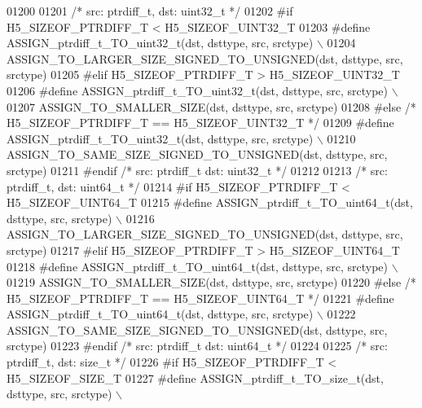 \begin{DoxyCode}
01200 
01201 \textcolor{comment}{/* src: ptrdiff\_t, dst: uint32\_t */}
01202 \textcolor{preprocessor}{#if H5\_SIZEOF\_PTRDIFF\_T < H5\_SIZEOF\_UINT32\_T}
01203 \textcolor{preprocessor}{    #define ASSIGN\_ptrdiff\_t\_TO\_uint32\_t(dst, dsttype, src, srctype) \(\backslash\)}
01204 \textcolor{preprocessor}{        ASSIGN\_TO\_LARGER\_SIZE\_SIGNED\_TO\_UNSIGNED(dst, dsttype, src, srctype)}
01205 \textcolor{preprocessor}{#elif H5\_SIZEOF\_PTRDIFF\_T > H5\_SIZEOF\_UINT32\_T}
01206 \textcolor{preprocessor}{    #define ASSIGN\_ptrdiff\_t\_TO\_uint32\_t(dst, dsttype, src, srctype) \(\backslash\)}
01207 \textcolor{preprocessor}{        ASSIGN\_TO\_SMALLER\_SIZE(dst, dsttype, src, srctype)}
01208 \textcolor{preprocessor}{#else }\textcolor{comment}{/* H5\_SIZEOF\_PTRDIFF\_T == H5\_SIZEOF\_UINT32\_T */}\textcolor{preprocessor}{}
01209 \textcolor{preprocessor}{    #define ASSIGN\_ptrdiff\_t\_TO\_uint32\_t(dst, dsttype, src, srctype) \(\backslash\)}
01210 \textcolor{preprocessor}{        ASSIGN\_TO\_SAME\_SIZE\_SIGNED\_TO\_UNSIGNED(dst, dsttype, src, srctype)}
01211 \textcolor{preprocessor}{#endif }\textcolor{comment}{/* src: ptrdiff\_t dst: uint32\_t */}\textcolor{preprocessor}{}
01212 
01213 \textcolor{comment}{/* src: ptrdiff\_t, dst: uint64\_t */}
01214 \textcolor{preprocessor}{#if H5\_SIZEOF\_PTRDIFF\_T < H5\_SIZEOF\_UINT64\_T}
01215 \textcolor{preprocessor}{    #define ASSIGN\_ptrdiff\_t\_TO\_uint64\_t(dst, dsttype, src, srctype) \(\backslash\)}
01216 \textcolor{preprocessor}{        ASSIGN\_TO\_LARGER\_SIZE\_SIGNED\_TO\_UNSIGNED(dst, dsttype, src, srctype)}
01217 \textcolor{preprocessor}{#elif H5\_SIZEOF\_PTRDIFF\_T > H5\_SIZEOF\_UINT64\_T}
01218 \textcolor{preprocessor}{    #define ASSIGN\_ptrdiff\_t\_TO\_uint64\_t(dst, dsttype, src, srctype) \(\backslash\)}
01219 \textcolor{preprocessor}{        ASSIGN\_TO\_SMALLER\_SIZE(dst, dsttype, src, srctype)}
01220 \textcolor{preprocessor}{#else }\textcolor{comment}{/* H5\_SIZEOF\_PTRDIFF\_T == H5\_SIZEOF\_UINT64\_T */}\textcolor{preprocessor}{}
01221 \textcolor{preprocessor}{    #define ASSIGN\_ptrdiff\_t\_TO\_uint64\_t(dst, dsttype, src, srctype) \(\backslash\)}
01222 \textcolor{preprocessor}{        ASSIGN\_TO\_SAME\_SIZE\_SIGNED\_TO\_UNSIGNED(dst, dsttype, src, srctype)}
01223 \textcolor{preprocessor}{#endif }\textcolor{comment}{/* src: ptrdiff\_t dst: uint64\_t */}\textcolor{preprocessor}{}
01224 
01225 \textcolor{comment}{/* src: ptrdiff\_t, dst: size\_t */}
01226 \textcolor{preprocessor}{#if H5\_SIZEOF\_PTRDIFF\_T < H5\_SIZEOF\_SIZE\_T}
01227 \textcolor{preprocessor}{    #define ASSIGN\_ptrdiff\_t\_TO\_size\_t(dst, dsttype, src, srctype) \(\backslash\)}

\end{DoxyCode}

